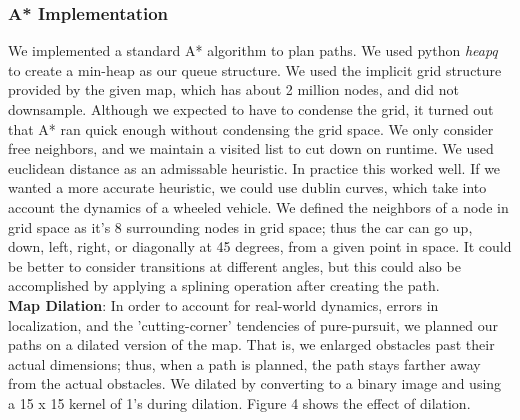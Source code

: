 \documentclass{article}
\begin{document}

\subsubsection{A* Implementation}
We implemented a standard A* algorithm to plan paths. We used python \textit{heapq} to create a min-heap as our queue structure. We used the implicit grid structure provided by the given map, which has about 2 million nodes, and did not downsample. Although we expected to have to condense the grid, it turned out that A* ran quick enough without condensing the grid space. We only consider free neighbors, and we maintain a visited list to cut down on runtime. We used euclidean distance as an admissable heuristic. In practice this worked well. If we wanted a more accurate heuristic, we could use dublin curves, which take into account the dynamics of a wheeled vehicle. We defined the neighbors of a node in grid space as it's 8 surrounding nodes in grid space; thus the car can go up, down, left, right, or diagonally at 45 degrees, from a given point in space. It could be better to consider transitions at different angles, but this could also be accomplished by applying a splining operation after creating the path. \\

\textbf{Map Dilation}: In order to account for real-world dynamics, errors in localization, and the 'cutting-corner' tendencies of pure-pursuit, we planned our paths on a dilated version of the map. That is, we enlarged obstacles past their actual dimensions; thus, when a path is planned, the path stays farther away from the actual obstacles. We dilated by converting to a binary image and using a 15 x 15 kernel of 1's during dilation. Figure 4 shows the effect of dilation.  
\end{document}
